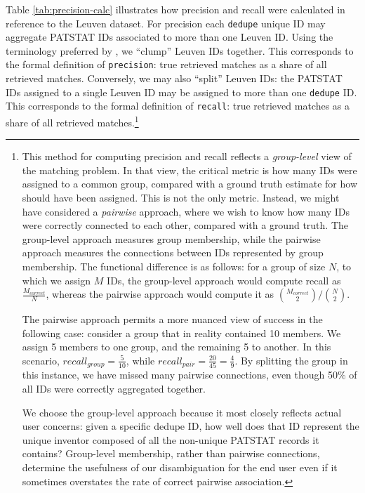 \documentclass[11pt]{article}
\begin{document}
Table \ref{tab:precision-calc} illustrates how precision and recall
were calculated in reference to the Leuven dataset. For precision each
\texttt{dedupe} unique ID may aggregate PATSTAT IDs associated to more
than one Leuven ID. Using the terminology preferred by
\cite{lai2011disambiguation}, we ``clump'' Leuven IDs together. This
corresponds to the formal definition of \texttt{precision}: true
retrieved matches as a share of all retrieved matches. Conversely, we may also ``split''
Leuven IDs: the PATSTAT IDs assigned to a single Leuven ID may be
assigned to more than one \texttt{dedupe} ID. This corresponds to the
formal definition of \texttt{recall}: true retrieved matches as a
share of all retrieved matches.\footnote{This method for computing
  precision and recall reflects a \textit{group-level} view of the
  matching problem. In that view, the critical metric is how many IDs
  were assigned to a common group, compared with a ground truth
  estimate for how should have been assigned. This is not the only
  metric. Instead, we might have considered a \textit{pairwise}
  approach, where we wish to know how many IDs were correctly
  connected to each other, compared with a ground truth. The
  group-level approach measures group membership, while the pairwise
  approach measures the connections between IDs represented by group
  membership. The functional difference is as follows: for a group of
  size $N$, to which we assign $M$ IDs, the group-level approach would
  compute recall as $\frac{M_{correct}}{N}$, whereas the pairwise
  approach would compute it as $\binom{M_{correct}}{2} /
  \binom{N}{2}$. 

  The pairwise approach permits a more nuanced view of success in the
  following case: consider a group that in reality contained 10
  members. We assign 5 members to one group, and the remaining 5 to
  another. In this scenario, $recall_{group} = \frac{5}{10}$, while
  $recall_{pair} = \frac{20}{45} = \frac{4}{9}$. By splitting the group in this
  instance, we have missed many pairwise connections, even though 50\%
  of all IDs were correctly aggregated together. 
  
  We choose the group-level approach because it most closely reflects
  actual user concerns: given a specific dedupe ID, how well does that
  ID represent the unique inventor composed of all the non-unique
  PATSTAT records it contains? Group-level membership, rather than
  pairwise connections, determine the usefulness of our disambiguation
  for the end user even if it sometimes overstates the rate of correct
  pairwise association.}
\end{document}

